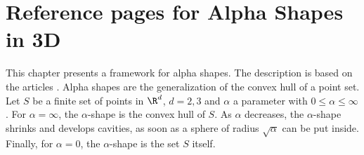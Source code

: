 %
%
%
%
%
%
%
%
%
%



\clearpage
\section{Reference pages for Alpha Shapes in 3D}

This chapter presents a framework for alpha shapes. The description is based on
the articles \cite{em-tdas-94,e-was-92}. Alpha shapes are
the generalization of the convex hull of a point set. Let $S$ be a finite set of
points in $\R^d$, $d = 2,3$ and $\alpha$ a parameter with $0 \leq \alpha \leq
\infty$. For $\alpha = \infty$, the $\alpha$-shape is the convex hull of $S$. As 
$\alpha$ decreases, the $\alpha$-shape shrinks and develops cavities, as soon as 
a sphere of radius $\sqrt{\alpha}$ can be put inside.
Finally, for $\alpha = 0$, the $\alpha$-shape is the set $S$ itself.

